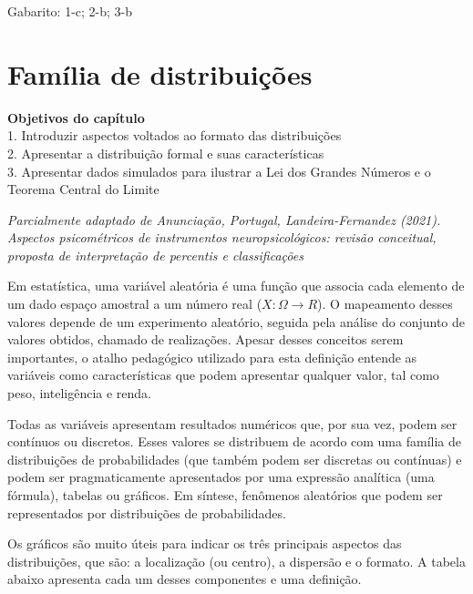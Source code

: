 \documentclass[
]{book}
\newenvironment{objectives}{
  \definecolor{shadecolor}{rgb}{0.764,0.992,0.686}  %
  \color{black}
  \begin{shaded}}
 {\end{shaded}}
\begin{document}
Gabarito: 1-c; 2-b; 3-b

\hypertarget{famuxedlia-de-distribuiuxe7uxf5es}{%
\chapter{Família de distribuições}\label{famuxedlia-de-distribuiuxe7uxf5es}}

\begin{objectives}
\textbf{Objetivos do capítulo}\\
1. Introduzir aspectos voltados ao formato das distribuições\\
2. Apresentar a distribuição formal e suas características\\
3. Apresentar dados simulados para ilustrar a Lei dos Grandes Números e o Teorema Central do Limite

\end{objectives}

\emph{Parcialmente adaptado de Anunciação, Portugal, Landeira-Fernandez (2021). Aspectos psicométricos de instrumentos neuropsicológicos: revisão conceitual, proposta de interpretação de percentis e classificações }

Em estatística, uma variável aleatória é uma função que associa cada elemento de um dado espaço amostral a um número real (\(X:\Omega \rightarrow R\)). O mapeamento desses valores depende de um experimento aleatório, seguida pela análise do conjunto de valores obtidos, chamado de realizações. Apesar desses conceitos serem importantes, o atalho pedagógico utilizado para esta definição entende as variáveis como características que podem apresentar qualquer valor, tal como peso, inteligência e renda.

Todas as variáveis apresentam resultados numéricos que, por sua vez, podem ser contínuos ou discretos. Esses valores se distribuem de acordo com uma família de distribuições de probabilidades (que também podem ser discretas ou contínuas) e podem ser pragmaticamente apresentados por uma expressão analítica (uma fórmula), tabelas ou gráficos. Em síntese, fenômenos aleatórios que podem ser representados por distribuições de probabilidades.

Os gráficos são muito úteis para indicar os três principais aspectos das distribuições, que são: a localização (ou centro), a dispersão e o formato. A tabela abaixo apresenta cada um desses componentes e uma definição.
\end{document}
